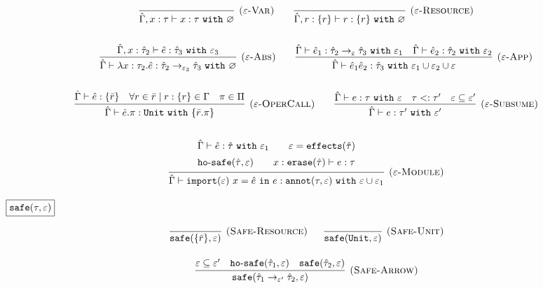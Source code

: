 \documentclass{llncs}
\newcommand{\keywadj}[1]{\mathtt{#1}}
\newcommand{\keyw}[1]{\keywadj{#1}~}
\newcommand{\kw}[1]{\keyw{ #1 }}
\newcommand{\kwa}[1]{\keywadj{ #1 }}
\newcommand{\hyphen}{\hbox{-}}
\begin{document}
\[
\begin{array}{c}

\infer[\textsc{($\varepsilon$-Var)}]
	{ \hat \Gamma, x:\tau \vdash x: \tau~\kw{with} \varnothing }
	{}
~~~~~~
\infer[\textsc{($\varepsilon$-Resource)}]
 	{ \hat \Gamma, r: \{ r \} \vdash r : \{ r \}~\kw{with} \varnothing }
 	{}\\[4ex]
 	
~~~~~~
	\infer[\textsc{($\varepsilon$-Abs)}]
	{ \hat \Gamma \vdash \lambda x:\tau_2 . \hat e : \hat \tau_2 \rightarrow_{\varepsilon_3} \hat \tau_3~\kw{with} \varnothing }
	{ \hat \Gamma, x: \hat \tau_2 \vdash \hat e: \hat \tau_3~\kw{with} \varepsilon_3 }
	
	~~~~~~
	
\infer[\textsc{($\varepsilon$-App)}]
	{ \hat \Gamma \vdash \hat e_1 \hat e_2 : \hat \tau_3~\kw{with} \varepsilon_1 \cup \varepsilon_2 \cup \varepsilon  }
	{ \hat \Gamma \vdash \hat e_1: \hat \tau_2 \rightarrow_{\varepsilon} \hat \tau_3~\kw{with} \varepsilon_1 & \hat \Gamma \vdash \hat e_2: \hat \tau_2~\kw{with} \varepsilon_2 } \\[4ex]
	
\infer[\textsc{($\varepsilon$-OperCall)}]
	{ \hat \Gamma \vdash \hat e.\pi: \kw{Unit} \kw{with} \{ \bar r.\pi \} }
	{ \hat \Gamma \vdash \hat e: \{ \bar r \} & \forall r \in \bar r \mid r: \{ r \} \in \Gamma & \pi \in \Pi }
	~~~~~~

\infer[\textsc{($\varepsilon$-Subsume)}]
	{ \hat \Gamma \vdash e: \tau' ~\kw{with} \varepsilon'}
	{ \hat \Gamma \vdash e: \tau ~\kw{with} \varepsilon & \tau <: \tau' & \varepsilon \subseteq \varepsilon'}\\[4ex]

\infer[\textsc{($\varepsilon$-Module)}]
	{ \hat \Gamma \vdash \kwa{import}(\varepsilon)~x = \hat e~\kw{in} e: \kwa{annot}(\tau, \varepsilon)~\kw{with} \varepsilon \cup \varepsilon_1 }
{{\def\arraystretch{1.4}
  \begin{array}{c}
\hat \Gamma \vdash \hat e: \hat \tau~\kw{with} \varepsilon_1
~~~~~~
\varepsilon = \kwa{effects}(\hat \tau) \\
\kwa{ho \hyphen safe}(\hat \tau, \varepsilon) ~~~~~~ x: \kwa{erase}(\hat \tau) \vdash e: \tau
  \end{array}}}
 
\end{array}
\]

\noindent
$\fbox{$\kwa{safe(\tau, \varepsilon)}$}$

\[
\begin{array}{c}

\infer[\textsc{(Safe-Resource)}]
	{\kwa{safe}(\{ \bar r \}, \varepsilon)}
	{}
~~~~~
\infer[\textsc{(Safe-Unit)}]
	{\kwa{safe}(\kwa{Unit}, \varepsilon)}
	{} \\[3ex]

\infer[\textsc{(Safe-Arrow)}]
	{\kwa{safe}(\hat \tau_1 \rightarrow_{\varepsilon'} \hat \tau_2, \varepsilon)}
	{\varepsilon \subseteq \varepsilon' & \kwa{ho \hyphen safe}(\hat \tau_1, \varepsilon) & \kwa{safe}(\hat \tau_2, \varepsilon)} \\[3ex]

\end{array}
\]
\end{document}
